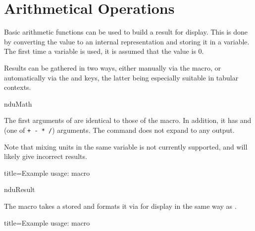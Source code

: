\documentclass[
	a4paper,
	margin=4cm
]{article}
\begin{document}
\clearpage
\section{Arithmetical Operations} %

Basic arithmetic functions can be used to build a result for display. This is done by converting the value to an internal representation and storing it in a variable. The first time a variable is used, it is assumed that the value is 0.

Results can be gathered in two ways, either manually via the  macro, or automatically via the  and  keys, the latter being especially suitable in tabular contexts.

\begin{docCommand}
	{nduMath}
	{}

	The first arguments of  are identical to those of the  macro. In addition, it has  and  (one of \texttt{+ - * /}) arguments. The command does not expand to any output.

	Note that mixing units in the same variable is not currently supported, and will likely give incorrect results.

\begin{dispExample*}{
	title=Example usage:  macro
}
\end{dispExample*}

\end{docCommand}

\begin{docCommand}
	{nduResult}
	{}

	The  macro takes a stored  and formats it via  for display in the same way as .

\begin{dispExample*}{
	title=Example usage:  macro
}
\begingroup
{}
\\
\endgroup
\end{dispExample*}

\end{docCommand}
\end{document}
